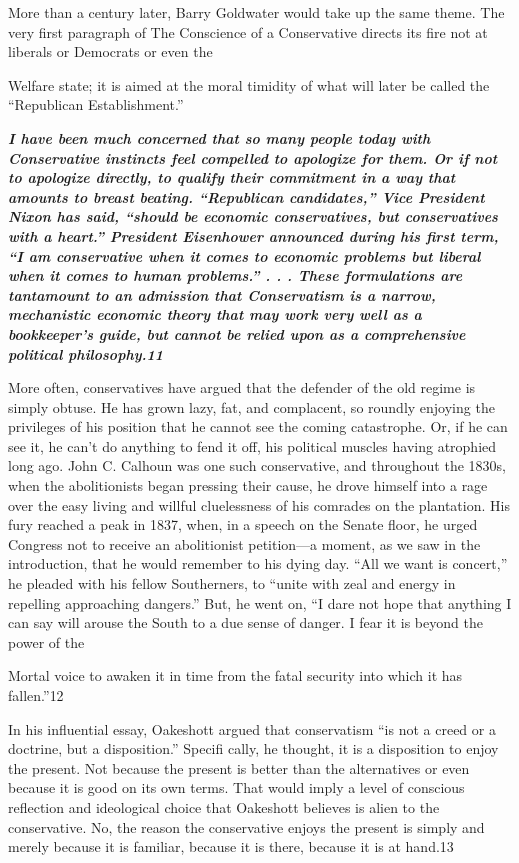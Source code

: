  \par 
More than a century later, Barry Goldwater would take up the same theme. The very first paragraph of The Conscience of a Conservative directs its fire not at liberals or Democrats or even the
 \par 
Welfare state; it is aimed at the moral timidity of what will later be called the “Republican Establishment.”
 \par 
\textit\textbf{ {I have been much concerned that so many people today with Conservative instincts feel compelled to apologize for them. Or if not to apologize directly, to qualify their commitment in a way that amounts to breast beating. “Republican candidates,” Vice President Nixon has said, “should be economic conservatives, but conservatives with a heart.” President Eisenhower announced during his first term, “I am conservative when it comes to economic problems but liberal when it comes to human problems.” . . . These formulations are tantamount to an admission that Conservatism is a narrow, mechanistic economic theory that may work very well as a bookkeeper’s guide, but cannot be relied upon as a comprehensive political philosophy.{\color{blue}11}} }
 \par 
More often, conservatives have argued that the defender of the old regime is simply obtuse. He has grown lazy, fat, and complacent, so roundly enjoying the privileges of his position that he cannot see the coming catastrophe. Or, if he can see it, he can’t do anything to fend it off, his political muscles having atrophied long ago. John C. Calhoun was one such conservative, and throughout the 1830s, when the abolitionists began pressing their cause, he drove himself into a rage over the easy living and willful cluelessness of his comrades on the plantation. His fury reached a peak in 1837, when, in a speech on the Senate floor, he urged Congress not to receive an abolitionist petition—a moment, as we saw in the introduction, that he would remember to his dying day. “All we want is concert,” he pleaded with his fellow Southerners, to “unite with zeal and energy in repelling approaching dangers.” But, he went on, “I dare not hope that anything I can say will arouse the South to a due sense of danger. I fear it is beyond the power of the
 \par 
Mortal voice to awaken it in time from the fatal security into which it has fallen.”{\color{blue}12}
 \par 
In his influential essay, Oakeshott argued that conservatism “is not a creed or a doctrine, but a disposition.” Specifi cally, he thought, it is a disposition to enjoy the present. Not because the present is better than the alternatives or even because it is good on its own terms. That would imply a level of conscious reflection and ideological choice that Oakeshott believes is alien to the conservative. No, the reason the conservative enjoys the present is simply and merely because it is familiar, because it is there, because it is at hand.{\color{blue}13}
